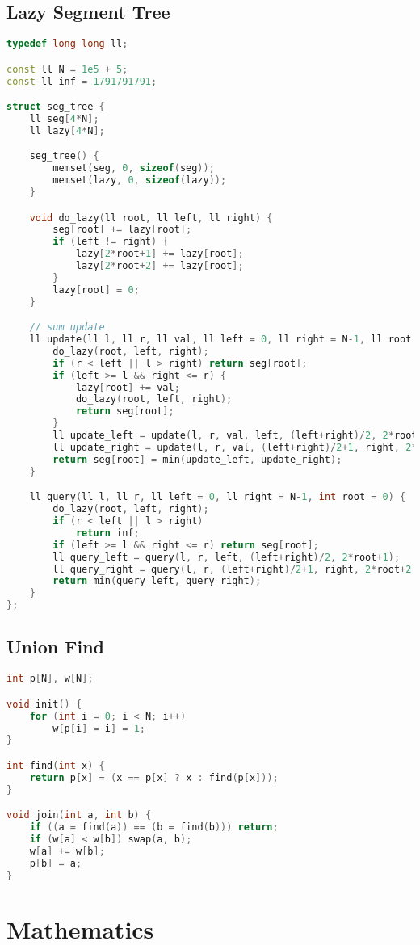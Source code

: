 \documentclass{article}
\begin{document}
\subsection{Lazy Segment Tree}
\begin{lstlisting}[language=C++]
typedef long long ll;

const ll N = 1e5 + 5;
const ll inf = 1791791791;

struct seg_tree {
	ll seg[4*N];
	ll lazy[4*N];

	seg_tree() {
		memset(seg, 0, sizeof(seg));
		memset(lazy, 0, sizeof(lazy));
	}

	void do_lazy(ll root, ll left, ll right) {
		seg[root] += lazy[root];
		if (left != right) {
			lazy[2*root+1] += lazy[root];
			lazy[2*root+2] += lazy[root];
		}
		lazy[root] = 0;
	}

	// sum update
	ll update(ll l, ll r, ll val, ll left = 0, ll right = N-1, ll root = 0) {
		do_lazy(root, left, right);
		if (r < left || l > right) return seg[root];
		if (left >= l && right <= r) {
			lazy[root] += val;
			do_lazy(root, left, right);
			return seg[root];
		}
		ll update_left = update(l, r, val, left, (left+right)/2, 2*root+1);
		ll update_right = update(l, r, val, (left+right)/2+1, right, 2*root+2);
		return seg[root] = min(update_left, update_right);
	}

	ll query(ll l, ll r, ll left = 0, ll right = N-1, int root = 0) {
		do_lazy(root, left, right);
		if (r < left || l > right)
			return inf;
		if (left >= l && right <= r) return seg[root];
		ll query_left = query(l, r, left, (left+right)/2, 2*root+1);
		ll query_right = query(l, r, (left+right)/2+1, right, 2*root+2);
		return min(query_left, query_right);
	}
};
\end{lstlisting}
\subsection{Union Find}
\begin{lstlisting}[language=C++]
int p[N], w[N];

void init() {
	for (int i = 0; i < N; i++)
		w[p[i] = i] = 1;
}

int find(int x) {
	return p[x] = (x == p[x] ? x : find(p[x]));
}

void join(int a, int b) {
	if ((a = find(a)) == (b = find(b))) return;
	if (w[a] < w[b]) swap(a, b);
	w[a] += w[b];
	p[b] = a;
}\end{lstlisting}
\section{Mathematics}
\end{document}
